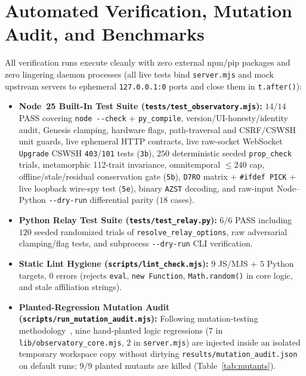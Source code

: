 \documentclass[11pt,reqno]{amsart}
\theoremstyle{definition}
\newcommand{\code}[1]{{\footnotesize\nolinkurl{#1}}}
\begin{document}
\section{Automated Verification, Mutation Audit, and Benchmarks}
\label{sec:verification}

All verification runs execute cleanly with zero external npm/pip packages and zero lingering daemon processes (all live tests bind \code{server.mjs} and mock upstream servers to ephemeral \code{127.0.0.1:0} ports and close them in \code{t.after()}):
\begin{itemize}[leftmargin=1.5em,itemsep=2pt]
  \item \textbf{Node~25 Built-In Test Suite (\code{tests/test\_observatory.mjs}):} $14/14$ PASS covering \code{node --check} + \code{py\_compile}, version/UI-honesty/identity audit, Genesis clamping, hardware flags, path-traversal and CSRF/CSWSH unit guards, live ephemeral HTTP contracts, live raw-socket WebSocket \code{Upgrade} CSWSH \code{403}/\code{101} tests (\code{3b}), $250$ deterministic seeded \code{prop\_check} trials, metamorphic 112-trait invariance, omnitemporal $\le 240$ cap, offline/stale/residual conservation gate (\code{5b}), \code{D7RO} matrix + \code{\#ifdef PICK} + live loopback wire-spy test (\code{5e}), binary \code{AZST} decoding, and raw-input Node--Python \code{--dry-run} differential parity ($18$ cases).
  \item \textbf{Python Relay Test Suite (\code{tests/test\_relay.py}):} $6/6$ PASS including $120$ seeded randomized trials of \code{resolve\_relay\_options}, raw adversarial clamping/flag tests, and subprocess \code{--dry-run} CLI verification.
  \item \textbf{Static Lint Hygiene (\code{scripts/lint\_check.mjs}):} $9$ JS/MJS + $5$ Python targets, $0$ errors (rejects \code{eval}, \code{new Function}, \code{Math.random()} in core logic, and stale affiliation strings).
  \item \textbf{Planted-Regression Mutation Audit (\code{scripts/run\_mutation\_audit.mjs}):} Following mutation-testing methodology~\cite{jia2011}, nine hand-planted logic regressions ($7$ in \code{lib/observatory\_core.mjs}, $2$ in \code{server.mjs}) are injected inside an isolated temporary workspace copy without dirtying \code{results/mutation\_audit.json} on default runs; $9/9$ planted mutants are killed (Table~\ref{tab:mutants}).
\end{itemize}
\end{document}
